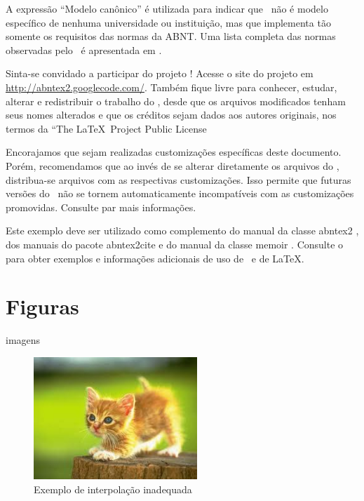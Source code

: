 \documentclass[
	article,			%
	11pt,				%
	oneside,			%
	a4paper,			%
	english,			%
	brazil,				%
	sumario=tradicional
	]{abntex2}
\begin{document}
A expressão ``Modelo canônico'' é utilizada para indicar que \abnTeX\ não é
modelo específico de nenhuma universidade ou instituição, mas que implementa tão
somente os requisitos das normas da ABNT. Uma lista completa das normas
observadas pelo \abnTeX\ é apresentada em .

Sinta-se convidado a participar do projeto \abnTeX! Acesse o site do projeto em
\url{http://abntex2.googlecode.com/}. Também fique livre para conhecer,
estudar, alterar e redistribuir o trabalho do \abnTeX, desde que os arquivos
modificados tenham seus nomes alterados e que os créditos sejam dados aos
autores originais, nos termos da ``The \LaTeX\ Project Public
License


Encorajamos que sejam realizadas customizações específicas deste documento.
Porém, recomendamos que ao invés de se alterar diretamente os arquivos do
\abnTeX, distribua-se arquivos com as respectivas customizações. Isso permite
que futuras versões do \abnTeX~não se tornem automaticamente incompatíveis com
as customizações promovidas. Consulte 
par mais informações.

Este exemplo deve ser utilizado como complemento do manual da classe
\textsf{abntex2} \cite{abntex2classe}, dos manuais do pacote
\textsf{abntex2cite} \cite{abntex2cite,abntex2cite-alf} e do manual da classe
\textsf{memoir} \cite{memoir}. Consulte o  para obter
exemplos e informações adicionais de uso de \abnTeX\ e de \LaTeX.



\newpage
\chapter{Figuras}
imagens
\begin{figure} [hbt] 
\centering
\label{Rotulo}
\label{figura1} 
\caption{Exemplo de interpolação inadequada}
\includegraphics[width=0.55\textwidth]{gato.jpg}
\end{figure}
\end{document}
